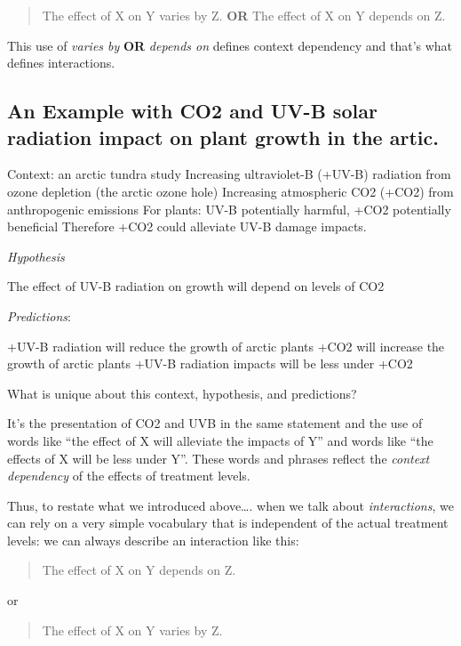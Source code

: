 \documentclass[
]{book}
\begin{document}
\begin{quote}
The effect of X on Y varies by Z. \textbf{OR} The effect of X on Y depends on Z.
\end{quote}

This use of \emph{varies by} \textbf{OR} \emph{depends on} defines context dependency and that's what defines interactions.

\hypertarget{an-example-with-co2-and-uv-b-solar-radiation-impact-on-plant-growth-in-the-artic.}{%
\subsection{An Example with CO2 and UV-B solar radiation impact on plant growth in the artic.}\label{an-example-with-co2-and-uv-b-solar-radiation-impact-on-plant-growth-in-the-artic.}}

Context: an arctic tundra study
Increasing ultraviolet-B (+UV-B) radiation from ozone depletion (the arctic ozone hole)
Increasing atmospheric CO2 (+CO2) from anthropogenic emissions
For plants: UV-B potentially harmful, +CO2 potentially beneficial
Therefore +CO2 could alleviate UV-B damage impacts.

\emph{Hypothesis}

The effect of UV-B radiation on growth will depend on levels of CO2

\emph{Predictions}:

+UV-B radiation will reduce the growth of arctic plants
+CO2 will increase the growth of arctic plants
+UV-B radiation impacts will be less under +CO2

What is unique about this context, hypothesis, and predictions?

It's the presentation of CO2 and UVB in the same statement and the use of words like ``the effect of X will alleviate the impacts of Y'' and words like ``the effects of X will be less under Y''. These words and phrases reflect the \emph{context dependency} of the effects of treatment levels.

Thus, to restate what we introduced above\ldots. when we talk about \emph{interactions}, we can rely on a very simple vocabulary that is independent of the actual treatment levels: we can always describe an interaction like this:

\begin{quote}
The effect of X on Y depends on Z.
\end{quote}

or

\begin{quote}
The effect of X on Y varies by Z.
\end{quote}
\end{document}

